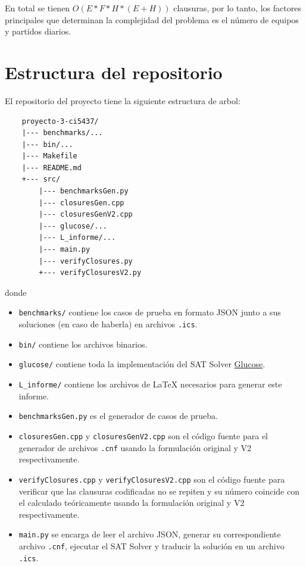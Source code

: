 \documentclass[a4paper,10pt]{article}
\begin{document}
    En total se tienen $O(E * F * H * (E + H))$ clausuras, por lo tanto, los factores
    principales que determinan la complejidad del problema es el n\'umero de equipos 
    y partidos diarios.

  
\section{Estructura del repositorio}
  El repositorio del proyecto tiene la siguiente estructura de arbol:

  \begin{verbatim}
    proyecto-3-ci5437/
    |--- benchmarks/...
    |--- bin/...
    |--- Makefile
    |--- README.md
    +--- src/
        |--- benchmarksGen.py
        |--- closuresGen.cpp
        |--- closuresGenV2.cpp
        |--- glucose/...
        |--- L_informe/...
        |--- main.py
        |--- verifyClosures.py
        +--- verifyClosuresV2.py
  \end{verbatim}

  \noindent
  donde 

  \begin{itemize}
    \item \verb|benchmarks/| contiene los casos de prueba en formato JSON junto
    a sus soluciones (en caso de haberla) en archivos \verb|.ics|.

    \item \verb|bin/| contiene los archivos binarios.
    
    \item \verb|glucose/| contiene toda la implementaci\'on del SAT Solver 
    \href{https://www.labri.fr/perso/lsimon/glucose/}{Glucose}.

    \item \verb|L_informe/| contiene los archivos de \LaTeX \hspace{0.075cm} 
    necesarios para generar este informe.

    \item \verb|benchmarksGen.py| es el generador de casos de prueba.

    \item \verb|closuresGen.cpp| y \verb|closuresGenV2.cpp| son el c\'odigo 
    fuente para el generador de archivos \verb|.cnf| usando la formulaci\'on 
    original y V2 respectivamente.

    \item \verb|verifyClosures.cpp| y \verb|verifyClosuresV2.cpp| son el c\'odigo 
    fuente para verificar que las clausuras codificadas no se repiten y su n\'umero 
    coincide con el calculado te\'oricamente usando la formulaci\'on original 
    y V2 respectivamente.

    \item \verb|main.py| se encarga de leer el archivo JSON, generar su correspondiente
    archivo \verb|.cnf|, ejecutar el SAT Solver y traducir la soluci\'on en un 
    archivo \verb|.ics|.
  \end{itemize}
\end{document}
